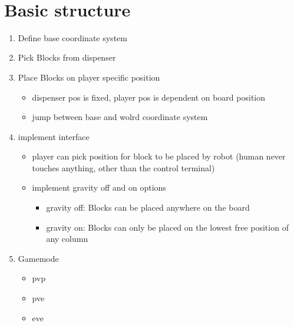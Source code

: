 \documentclass{article}
\begin{document}
  \makeHeader\
  \newpage
  \tableofcontents
  \newpage
  \section{Basic structure}
  \begin{enumerate}
    \item Define base coordinate system
    \item Pick Blocks from dispenser 
    \item Place Blocks on player specific position
    \begin{itemize}
      \item dispenser pos is fixed, player pos is dependent on board position
      \item jump between base and wolrd coordinate system
    \end{itemize}
    \item implement interface
    \begin{itemize}
      \item player can pick position for block to be placed by robot (human never touches anything, other than the control terminal)
      \item implement gravity off and on options
      \begin{itemize}
        \item gravity off: Blocks can be placed anywhere on the board
        \item gravity on: Blocks can only be placed on the lowest free position of any column
      \end{itemize}
    \end{itemize}
    \item Gamemode 
    \begin{itemize}
      \item pvp
      \item pve
      \item eve
    \end{itemize}
  \end{enumerate}
\end{document}
